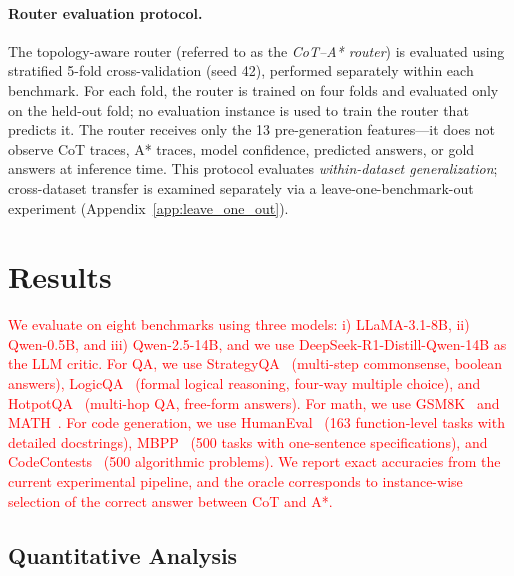 \documentclass[11pt]{article}
\begin{document}
\paragraph{Router evaluation protocol.} The topology-aware router (referred to as the \emph{CoT--A* router}) is evaluated using stratified 5-fold cross-validation (seed 42), performed separately within each benchmark. For each fold, the router is trained on four folds and evaluated only on the held-out fold; no evaluation instance is used to train the router that predicts it. The router receives only the 13 pre-generation features---it does not observe CoT traces, A* traces, model confidence, predicted answers, or gold answers at inference time. This protocol evaluates \emph{within-dataset generalization}; cross-dataset transfer is examined separately via a leave-one-benchmark-out experiment (Appendix~\ref{app:leave_one_out}).




\section{Results}
\label{sec:results}

\textcolor{red}{We evaluate on eight benchmarks using three models: i) LLaMA-3.1-8B, ii) Qwen-0.5B, and iii) Qwen-2.5-14B, and we use DeepSeek-R1-Distill-Qwen-14B as the LLM critic. For QA, we use StrategyQA~\cite{geva2021did} (multi-step commonsense, boolean answers), LogicQA~\cite{liu2020logiqa} (formal logical reasoning, four-way multiple choice), and HotpotQA~\cite{yang2018hotpotqa} (multi-hop QA, free-form answers). For math, we use GSM8K~\cite{cobbe2021trainingverifierssolvemath} and MATH~\cite{hendrycks2021measuringmathematicalproblemsolving}. For code generation, we use HumanEval~\cite{chen2021humaneval} (163 function-level tasks with detailed docstrings), MBPP~\cite{austin2021mbpp} (500 tasks with one-sentence specifications), and CodeContests~\cite{li2022codecontests} (500 algorithmic problems). We report exact accuracies from the current experimental pipeline, and the oracle corresponds to instance-wise selection of the correct answer between CoT and A*.}

\subsection{Quantitative Analysis}
\label{sec:quantitative}
\end{document}

